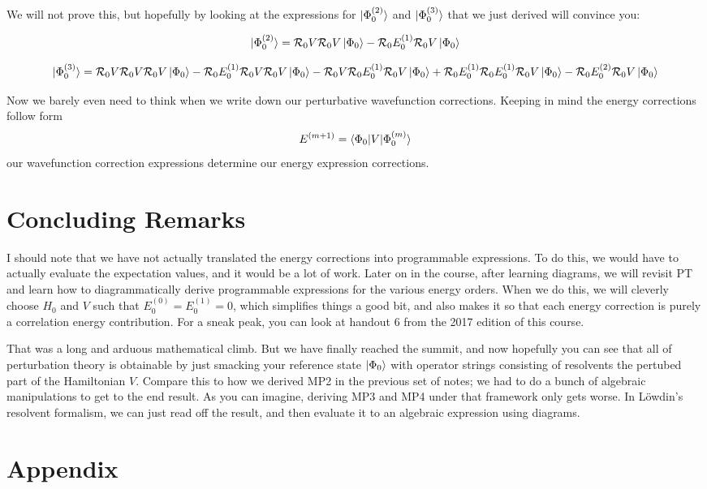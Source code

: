 \documentclass{article}
\newcommand{\Rz}{\mathcal{R}_{0}}
\newcommand{\Eone}{E^{(1)}}
\begin{document}
We will not prove this, but hopefully by looking at the expressions for  $\ket{\Phi_0^{(2)}}$ and $\ket{\Phi_0^{(3)}}$ that we just derived will convince you:

\[\ket{\Phi_0^{(2)}} = \Rz V \Rz V \ket{\Phi_0} - \Rz \Eone_0 \Rz V \ket{\Phi_0}\]

\[\ket{\Phi_0^{(3)}} = \Rz V \Rz V \Rz V \ket{\Phi_0} - \Rz \Eone_0 \Rz V \Rz V \ket{\Phi_0} 
  - \Rz V \Rz \Eone_0 \Rz V \ket{\Phi_0} + \Rz E_0^{(1)} \Rz E_0^{(1)} \Rz V \ket{\Phi_0} 
 - \Rz E_0^{(2)} \Rz V \ket{\Phi_0} \]


Now we barely even need to think when we write down our perturbative wavefunction corrections.
Keeping in mind the energy corrections follow form
\[ E^{(m+1)} = \braket{\Phi_0 | V | \Phi_0^{(m)}} \]
our wavefunction correction expressions determine our energy expression corrections.

\section{Concluding Remarks}
I should note that we have not actually translated the energy corrections into 
programmable expressions. 
To do this, we would have to actually evaluate the expectation values, and it would 
be a lot of work.
Later on in the course, after learning diagrams, we will revisit PT and learn 
how to diagrammatically derive programmable expressions for the various energy orders.
When we do this, we will cleverly choose $H_0$ and $V$ such that $E_0^{(0)} = E_0^{(1)} = 0$,
which simplifies things a good bit, and also makes it so that each energy
correction is purely a correlation energy contribution. 
For a sneak peak, you can look at handout 6 from the 2017 edition of this course.


That was a long and arduous mathematical climb. But we have finally reached the summit,
and now hopefully you can see that all of perturbation theory is obtainable by just 
smacking your reference state $\ket{\Phi_0}$ with operator strings consisting 
of resolvents the pertubed part of the Hamiltonian $V$. 
Compare this to how we derived MP2 in the previous set of notes; we had to do a bunch of 
algebraic manipulations to get to the end result. 
As you can imagine, deriving MP3 and MP4 under that framework only gets worse. 
In L{\"o}wdin's resolvent formalism, we can just read off the result, 
    and then evaluate it to an algebraic expression using diagrams. 

\section{Appendix}
\end{document}
